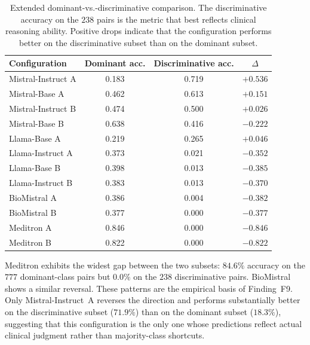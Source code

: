 \begin{table}[htbp]
    \centering
    \caption{Extended dominant-vs.-discriminative comparison. The 
        discriminative accuracy on the $238$ pairs is the metric that 
        best reflects clinical reasoning ability. Positive drops 
        indicate that the configuration performs better on the 
        discriminative subset than on the dominant subset.}
    \label{tab:app-discriminative}
    \small
    \begin{tabular}{@{}lccc@{}}
        \toprule
        \textbf{Configuration} & 
        \textbf{Dominant acc.} & 
        \textbf{Discriminative acc.} & 
        \boldmath$\Delta$ \\
        \midrule
        Mistral-Instruct A & 0.183 & 0.719 & $+0.536$ \\
        Mistral-Base A     & 0.462 & 0.613 & $+0.151$ \\
        Mistral-Instruct B & 0.474 & 0.500 & $+0.026$ \\
        Mistral-Base B     & 0.638 & 0.416 & $-0.222$ \\
        Llama-Base A       & 0.219 & 0.265 & $+0.046$ \\
        Llama-Instruct A   & 0.373 & 0.021 & $-0.352$ \\
        Llama-Base B       & 0.398 & 0.013 & $-0.385$ \\
        Llama-Instruct B   & 0.383 & 0.013 & $-0.370$ \\
        BioMistral A       & 0.386 & 0.004 & $-0.382$ \\
        BioMistral B       & 0.377 & 0.000 & $-0.377$ \\
        Meditron A         & 0.846 & 0.000 & $-0.846$ \\
        Meditron B         & 0.822 & 0.000 & $-0.822$ \\
        \bottomrule
    \end{tabular}
\end{table}

Meditron exhibits the widest gap between the two subsets: $84.6\%$ 
accuracy on the $777$ dominant-class pairs but $0.0\%$ on the $238$ 
discriminative pairs. BioMistral shows a similar reversal. These 
patterns are the empirical basis of Finding~F9. Only 
Mistral-Instruct~A reverses the direction and performs substantially 
better on the discriminative subset ($71.9\%$) than on the dominant 
subset ($18.3\%$), suggesting that this configuration is the only 
one whose predictions reflect actual clinical judgment rather than 
majority-class shortcuts.

